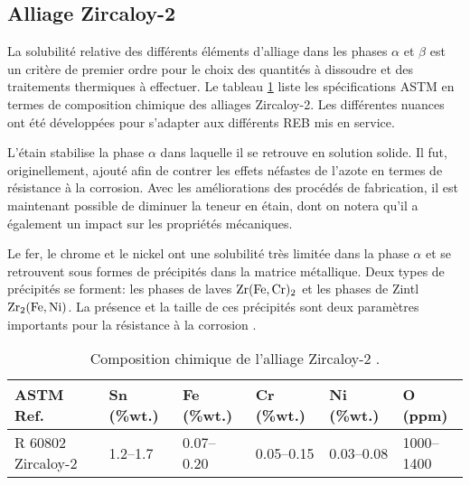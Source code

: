\begin{refsection}
    

    \subsection{Alliage Zircaloy-2}\label{subsec:Zircaloy-2}

    La solubilité relative des différents éléments d’alliage dans les phases
    $\alpha$ et $\beta$ est un critère de premier ordre pour le choix des quantités à dissoudre
    et des traitements thermiques à effectuer. Le tableau
    \ref{tab:zircaloy_chemical_composition} liste les spécifications ASTM en termes de
    composition chimique des alliages Zircaloy-2. Les différentes nuances ont été développées 
    pour s'adapter aux différents REB mis en service.

    

    L’étain stabilise la phase $\alpha$ dans laquelle il se retrouve en solution
    solide. Il fut, originellement, ajouté afin de contrer les effets néfastes de
    l’azote en termes de résistance à la corrosion. Avec les améliorations des
    procédés de fabrication, il est maintenant possible de diminuer la teneur en
    étain, dont on notera qu'il a également un impact sur les propriétés mécaniques. 

    Le fer, le chrome et le nickel ont une solubilité très limitée dans la phase
    $\alpha$ et se retrouvent sous formes de précipités dans la matrice métallique.
    Deux types de précipités se forment: les phases de laves $\rm Zr(Fe,Cr)_2$ et
    les phases de Zintl $\rm Zr_2(Fe,Ni)$. La présence et la taille de ces
    précipités sont deux paramètres importants pour la résistance à la corrosion
    \citep{Barberis2005}. 

    \begin{table}[H]
        \begin{small}
        \centering
        \begin{tabular}{p{}%
                        p{}%
                        p{}%
                        p{}%
                        p{}%
                        p{}}
        \toprule
        \textbf{ASTM Ref.} & \textbf{Sn (\%wt.)} & \textbf{Fe (\%wt.)} & \textbf{Cr (\%wt.)} & \textbf{Ni (\%wt.)} & \textbf{O (ppm)} \\ \midrule
        R 60802 Zircaloy-2 & 1.2--1.7 & 0.07--0.20 & 0.05--0.15 & 0.03--0.08 & 1000--1400\\
        \bottomrule
        \end{tabular}
        \caption[Composition chimique (ASTM) de l'alliage Zircaloy-2.]{Composition chimique de l'alliage Zircaloy-2 \citep{IAEA1998}.}
        \label{tab:zircaloy_chemical_composition}
        \end{small}
    \end{table}




\end{refsection}
